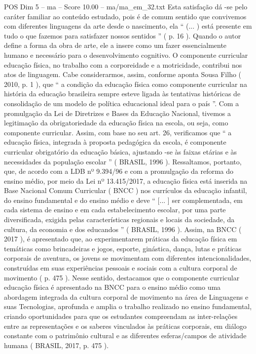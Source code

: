 \begin{textsample}{POS Dim 5 – ma – Score 10.00 – ma/ma\_em\_32.txt}
Esta satisfação dá -se pelo caráter familiar ao conteúdo estudado, pois é de comum sentido que convivemos com diferentes linguagens da arte desde o nascimento, ela “ (... ) está presente em tudo o que fazemos para satisfazer nossos sentidos ” ( p. 16 ).
Quando o autor define a forma da obra de arte, ele a insere como um fazer essencialmente humano e necessário para o desenvolvimento cognitivo.
O componente curricular educação física, no trabalho com a corporeidade e a motricidade, contribui nos atos de linguagem.
Cabe considerarmos, assim, conforme aponta Sousa Filho ( 2010, p. 1 ), que “ a condição da educação física como componente curricular na história da educação brasileira sempre esteve ligada às tentativas históricas de consolidação de um modelo de política educacional ideal para o país ”.
Com a promulgação da Lei de Diretrizes e Bases da Educação Nacional, tivemos a legitimação da obrigatoriedade da educação física na escola, ou seja, como componente curricular.
Assim, com base no seu art. 26, verificamos que “ a educação física, integrada à proposta pedagógica da escola, é componente curricular obrigatório da educação básica, ajustando -se às faixas etárias e às necessidades da população escolar ” ( BRASIL, 1996 ).
Ressaltamos, portanto, que, de acordo com a LDB nº 9.394/96 e com a promulgação da reforma do ensino médio, por meio da Lei nº 13.415/2017, a educação física está inserida na Base Nacional Comum Curricular ( BNCC ) nos currículos da educação infantil, do ensino fundamental e do ensino médio e deve “ [... ] ser complementada, em cada sistema de ensino e em cada estabelecimento escolar, por uma parte diversificada, exigida pelas características regionais e locais da sociedade, da cultura, da economia e dos educandos ” ( BRASIL, 1996 ).
Assim, na BNCC ( 2017 ), é apresentado que, ao experimentarem práticas da educação física em temáticas como brincadeiras e jogos, esporte, ginástica, dança, lutas e práticas corporais de aventura, os jovens se movimentam com diferentes intencionalidades, construídas em suas experiências pessoais e sociais com a cultura corporal de movimento ( p. 475 ).
Nesse sentido, destacamos que o componente curricular educação física é apresentado na BNCC para o ensino médio como uma abordagem integrada da cultura corporal de movimento na área de Linguagens e suas Tecnologias, aprofunda e amplia o trabalho realizado no ensino fundamental, criando oportunidades para que os estudantes compreendam as inter-relações entre as representações e os saberes vinculados às práticas corporais, em diálogo constante com o patrimônio cultural e as diferentes esferas/campos de atividade humana ( BRASIL, 2017, p. 475 ).

\end{textsample}

